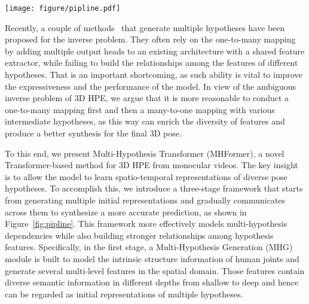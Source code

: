 \documentclass[10pt,twocolumn,letterpaper]{article}
\def\VspaceL{\vspace{-0.40cm}}
\begin{document}
\begin{figure*}[htb]
  \centering
  \texttt{[image: figure/pipline.pdf]}
  \caption
  {The proposed MHFormer constructs a three-stage framework by starting from generating multiple initial representations and then communicating among them in both independent and mutual ways to synthesize a more precise estimation.
  For easy illustration, we only show the process of a single-frame 2D pose as input.}
  \label{fig:pipline}
  \VspaceL
\end{figure*}

Recently, a couple of methods~\cite{khirodkar2021multi,sharma2019monocular,li2019generating,wehrbein2021probabilistic} that generate multiple hypotheses have been proposed for the inverse problem. 
They often rely on the one-to-many mapping by adding multiple output heads to an existing architecture with a shared feature extractor, while failing to build the relationships among the features of different hypotheses. 
That is an important shortcoming, as such ability is vital to improve the expressiveness and the performance of the model. 
In view of the ambiguous inverse problem of 3D HPE, we argue that it is more reasonable to conduct a one-to-many mapping first and then a many-to-one mapping with various intermediate hypotheses, as this way can enrich the diversity of features and produce a better synthesis for the final 3D pose. 

To this end, we present Multi-Hypothesis Transformer (MHFormer), a novel Transformer-based method for 3D HPE from monocular videos. 
The key insight is to allow the model to learn spatio-temporal representations of diverse pose hypotheses. 
To accomplish this, we introduce a three-stage framework that starts from generating multiple initial representations and gradually communicates across them to synthesize a more accurate prediction, as shown in Figure~\ref{fig:pipline}. 
This framework more effectively models multi-hypothesis dependencies while also building stronger relationships among hypothesis features. 
Specifically, in the first stage, a Multi-Hypothesis Generation (MHG) module is built to model the intrinsic structure information of human joints and generate several multi-level features in the spatial domain. 
Those features contain diverse semantic information in different depths from shallow to deep and hence can be regarded as initial representations of multiple hypotheses. 
\end{document}
